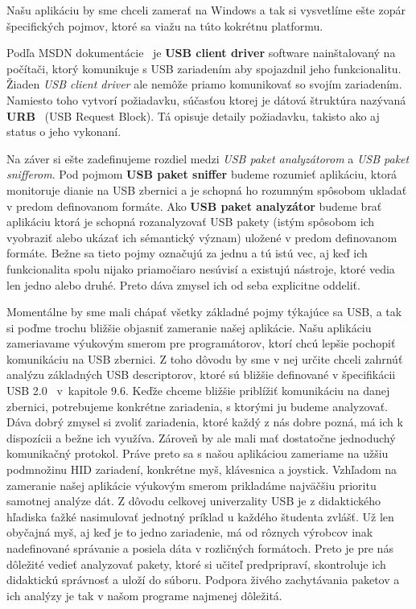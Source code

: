 Našu aplikáciu by sme chceli zamerať na Windows a tak si vysvetlíme ešte zopár špecifických pojmov, ktoré sa viažu na túto kokrétnu platformu.

Podľa MSDN dokumentácie~\cite{usbclientdriver} je \textbf{USB client driver} software nainštalovaný na počítači, ktorý komunikuje s USB zariadením aby spojazdnil jeho funkcionalitu. Žiaden \textit{USB client driver} ale nemôže priamo komunikovať so svojím zariadením. Namiesto toho vytvorí požiadavku, súčasťou ktorej je dátová štruktúra nazývaná \textbf{URB}~\cite{usburb} (USB Request Block). Tá opisuje detaily požiadavku, takisto ako aj status o jeho vykonaní.

Na záver si ešte zadefinujeme rozdiel medzi \textit{USB paket analyzátorom} a \textit{USB paket snifferom}. Pod pojmom \textbf{USB paket sniffer} budeme rozumieť aplikáciu, ktorá monitoruje dianie na USB zbernici a je schopná ho rozumným spôsobom ukladať v predom definovanom formáte. Ako \textbf{USB paket analyzátor} budeme brať aplikáciu ktorá je schopná rozanalyzovať USB pakety (istým spôsobom ich vyobraziť alebo ukázať ich sémantický význam) uložené v predom definovanom formáte. Bežne sa tieto pojmy označujú za jednu a tú istú vec, aj keď ich funkcionalita spolu nijako priamočiaro nesúvisí a existujú nástroje, ktoré vedia len jedno alebo druhé. Preto dáva zmysel ich od seba explicitne oddeliť.

Momentálne by sme mali chápať všetky základné pojmy týkajúce sa USB, a tak si poďme trochu bližšie objasniť zameranie našej aplikácie. Našu aplikáciu zameriavame výukovým smerom pre programátorov, ktorí chcú lepšie pochopiť komunikáciu na USB zbernici. Z toho dôvodu by sme v nej určite chceli zahrnúť analýzu základných USB descriptorov, ktoré sú bližšie definované v špecifikácii USB 2.0~\cite{usbdoc} v~kapitole 9.6. Keďže chceme bližšie priblížiť komunikáciu na danej zbernici, potrebujeme konkrétne zariadenia, s ktorými ju budeme analyzovať. Dáva dobrý zmysel si zvoliť zariadenia, ktoré každý z nás dobre pozná, má ich k dispozícii a bežne ich využíva. Zároveň by ale mali mať dostatočne jednoduchý komunikačný protokol. Práve preto sa s našou aplikáciou zameriame na užšiu podmnožinu HID zariadení, konkrétne myš, klávesnica a joystick. Vzhľadom na zameranie našej aplikácie výukovým smerom prikladáme najväčšiu prioritu samotnej analýze dát.  Z dôvodu celkovej univerzality USB je z didaktického hľadiska ťažké nasimulovať jednotný príklad u každého študenta zvlášť. Už len obyčajná myš, aj keď je to jedno zariadenie, má od rôznych výrobcov inak nadefinované správanie a posiela dáta v rozličných formátoch. Preto je pre nás dôležité vedieť analyzovať pakety, ktoré si učiteľ predpripraví, skontroluje ich didaktickú správnosť a uloží do súboru. Podpora živého zachytávania paketov a ich analýzy je tak v našom programe najmenej dôležitá.

